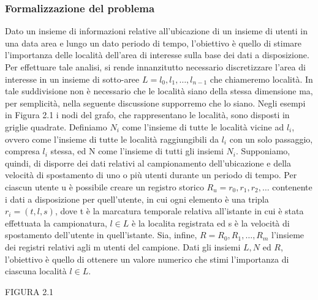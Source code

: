 \subsubsection{Formalizzazione del problema}
Dato un insieme di informazioni relative all'ubicazione di un insieme di utenti
in una data area e lungo un dato periodo di tempo, l'obiettivo \`e quello
di stimare l'importanza delle localit\`a dell'area di interesse sulla base dei dati
a disposizione. Per effettuare tale analisi, si rende innanzitutto necessario
discretizzare l'area di interesse in un insieme di sotto-aree $L = l_{0},l_{1},\dots,l_{n-1}$
che chiameremo localit\`a. In tale suddivisione non \`e necessario che le localit\`a
siano della stessa dimensione ma, per semplicit\`a, nella seguente discussione
supporremo che lo siano. Negli esempi in Figura 2.1 i nodi del grafo, che rappresentano
le localit\`a, sono disposti in griglie quadrate. Definiamo $N_{i}$ come
l'insieme di tutte le localit\`a vicine ad $l_{i}$, ovvero come l'insieme di tutte le localit\`a
 raggiungibili da $l_{i}$ con un solo passaggio, compresa $l_{i}$ stessa, ed N come
l'insieme di tutti gli insiemi $N_{i}$. Supponiamo, quindi, di disporre dei dati relativi
al campionamento dell'ubicazione e della velocit\`a di spostamento di uno
o pi\`u utenti durante un periodo di tempo. Per ciascun utente u \`e possibile
creare un registro storico $R_{u} = r_{0},r_{1},r_{2},\dots$ contenente i dati a disposizione
per quell'utente, in cui ogni elemento \`e una tripla $r_{i} = (t,l,s)$, dove t \`e la marcatura
temporale relativa all'istante in cui \`e stata effettuata la campionatura,
$l \in L$ \`e la localita registrata ed s \`e la velocit\`a di spostamento dell'utente in
quell'istante. Sia, infine, $R = R_{0},R_{1},\dots,R_{m}$ l'insieme dei registri relativi agli m
utenti del campione. Dati gli insiemi $L, N$ ed $R$, l'obiettivo \`e quello di ottenere
un valore numerico che stimi l'importanza di ciascuna localit\`a $l \in L$.

FIGURA  2.1

